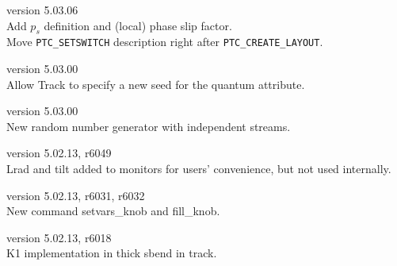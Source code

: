 \begin{madlist}


   version 5.03.06 \\
  Add $p_s$ definition and (local) phase slip factor. \\
 Move \texttt{PTC\_SETSWITCH} description right after \texttt{PTC\_CREATE\_LAYOUT}.

   version 5.03.00 \\
  Allow Track to specify a new seed for the quantum attribute.

   version 5.03.00 \\
  New random number generator with independent streams.


   version 5.02.13, r6049 \\
  Lrad and tilt added to monitors for users' convenience, but not used internally.

  
 
   version 5.02.13, r6031, r6032 \\
  New command setvars\_knob and fill\_knob.
  


   version 5.02.13, r6018 \\
  K1 implementation in thick sbend in track.


\end{madlist}
